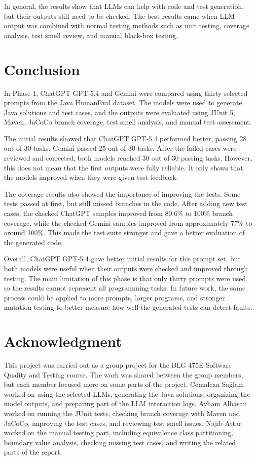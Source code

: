 \documentclass[journal]{IEEEtran}
\begin{document}
In general, the results show that LLMs can help with code and test generation, but their outputs still need to be checked. The best results came when LLM output was combined with normal testing methods such as unit testing, coverage analysis, test smell review, and manual black-box testing.

\section{Conclusion}

In Phase 1, ChatGPT GPT-5.4 and Gemini were compared using thirty selected prompts from the Java HumanEval dataset. The models were used to generate Java solutions and test cases, and the outputs were evaluated using JUnit 5, Maven, JaCoCo branch coverage, test smell analysis, and manual test assessment.

The initial results showed that ChatGPT GPT-5.4 performed better, passing 28 out of 30 tasks. Gemini passed 25 out of 30 tasks. After the failed cases were reviewed and corrected, both models reached 30 out of 30 passing tasks. However, this does not mean that the first outputs were fully reliable. It only shows that the models improved when they were given test feedback.

The coverage results also showed the importance of improving the tests. Some tests passed at first, but still missed branches in the code. After adding new test cases, the checked ChatGPT samples improved from 80.6\% to 100\% branch coverage, while the checked Gemini samples improved from approximately 77\% to around 100\%. This made the test suite stronger and gave a better evaluation of the generated code.

Overall, ChatGPT GPT-5.4 gave better initial results for this prompt set, but both models were useful when their outputs were checked and improved through testing. The main limitation of this phase is that only thirty prompts were used, so the results cannot represent all programming tasks. In future work, the same process could be applied to more prompts, larger programs, and stronger mutation testing to better measure how well the generated tests can detect faults.

\section*{Acknowledgment}
This project was carried out as a group project for the BLG 475E Software Quality and Testing course. The work was shared between the group members, but each member focused more on some parts of the project. Cemalcan Sağlam worked on using the selected LLMs, generating the Java solutions, organizing the model outputs, and preparing part of the LLM interaction logs. Ayham Alhasan worked on running the JUnit tests, checking branch coverage with Maven and JaCoCo, improving the test cases, and reviewing test smell issues. Najib Attar worked on the manual testing part, including equivalence class partitioning, boundary value analysis, checking missing test cases, and writing the related parts of the report.
\end{document}
